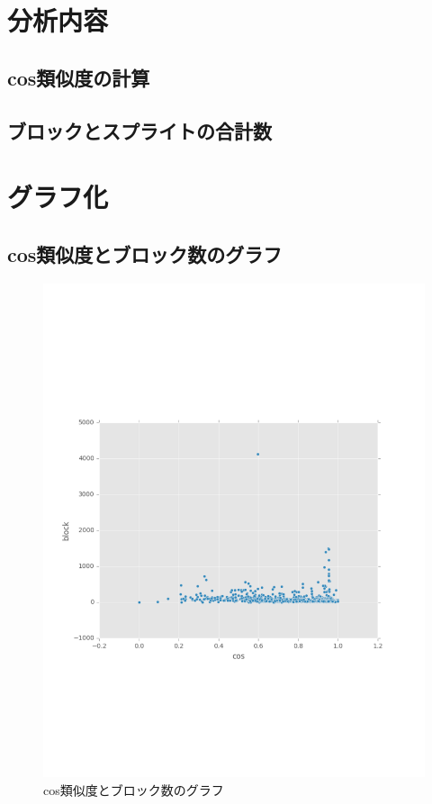 \documentclass[a4paper,10pt,onecolumn,oneside,openany]{jsbook}
\begin{document}
\section{分析内容}
\subsection{cos類似度の計算}

\subsection{ブロックとスプライトの合計数}



\section{グラフ化}

\subsection{cos類似度とブロック数のグラフ}
\begin{figure}[h]
  \centering
    \includegraphics[scale=0.8]{graphic/block_graph.pdf}
  \caption{cos類似度とブロック数のグラフ}
 \end{figure}
 
\end{document}
